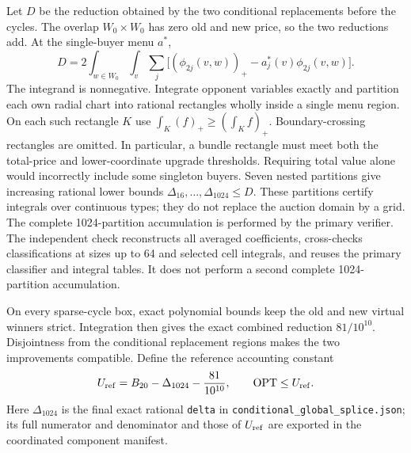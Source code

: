 Let $D$ be the reduction obtained by the two conditional replacements
before the cycles. The overlap $W_0\times W_0$ has zero old and new price,
so the two reductions add. At the single-buyer menu $a^*$,
\[
 D=2\int_{w\in W_0}\int_v\sum_j
       \big[(\phi_{2j}(v,w))_+-a_j^*(v)\phi_{2j}(v,w)\big].
\]
The integrand is nonnegative. Integrate opponent variables exactly and
partition each own radial chart into rational rectangles wholly inside a
single menu region. On each such rectangle $K$ use
$\int_K(f)_+\ge(\int_K f)_+$. Boundary-crossing rectangles are omitted.
In particular, a bundle rectangle must meet both the total-price and
lower-coordinate upgrade thresholds. Requiring total value alone would
incorrectly include some singleton buyers. Seven nested partitions give
increasing rational lower bounds $\Delta_{16},\ldots,\Delta_{1024}\le D$.
These partitions certify integrals over continuous types; they do not
replace the auction domain by a grid.
The complete 1024-partition accumulation is performed by the primary
verifier. The independent check reconstructs all averaged coefficients,
cross-checks classifications at sizes up to 64 and selected cell integrals,
and reuses the primary classifier and integral tables. It does not perform
a second complete 1024-partition accumulation.

On every sparse-cycle box, exact polynomial bounds keep the old and new
virtual winners strict. Integration then gives the exact combined
reduction $81/10^{10}$. Disjointness from the conditional replacement
regions makes the two improvements compatible. Define the reference accounting constant
\begin{equation}\label{eq:common-upper-endpoint}
 U_{\rm ref}=B_{20}-\Delta_{1024}-\frac{81}{10^{10}},\qquad \operatorname{OPT}\le U_{\rm ref}.
\end{equation}
Here $\Delta_{1024}$ is the final exact rational \texttt{delta} in
\texttt{conditional\_global\_splice.json};
its full numerator and denominator and those of $U_{\rm ref}$ are exported in
the coordinated component manifest.
